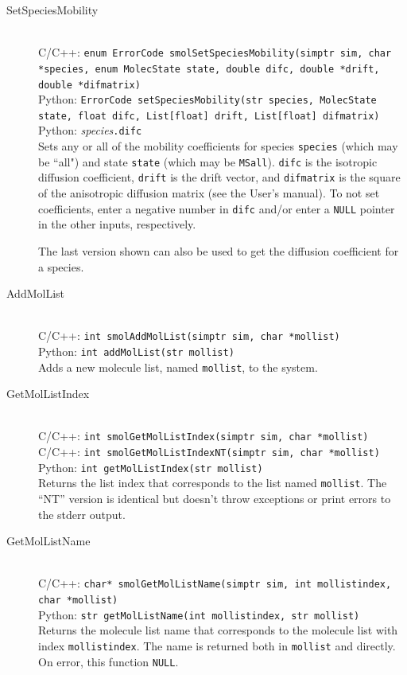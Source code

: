\documentclass {scrbook}
\newcommand {\ttt} {\texttt}
\begin{document}
\begin{description}
\item[SetSpeciesMobility]
\hfill \\
C/C++: \ttt{enum ErrorCode smolSetSpeciesMobility(simptr sim, char *species, enum MolecState state, double difc, double *drift, double *difmatrix)}\\
Python: \ttt{ErrorCode setSpeciesMobility(str species, MolecState state, float difc, List[float] drift, List[float] difmatrix)}\\
Python: \textit{species}\ttt{.difc}\\
Sets any or all of the mobility coefficients for species \ttt{species} (which may be ``all") and state \ttt{state} (which may be \ttt{MSall}). \ttt{difc} is the isotropic diffusion coefficient, \ttt{drift} is the drift vector, and \ttt{difmatrix} is the square of the anisotropic diffusion matrix (see the User's manual). To not set coefficients, enter a negative number in \ttt{difc} and/or enter a \ttt{NULL} pointer in the other inputs, respectively.

The last version shown can also be used to get the diffusion coefficient for a species.


\item[AddMolList]
\hfill \\
C/C++: \ttt{int smolAddMolList(simptr sim, char *mollist)}\\
Python: \ttt{int addMolList(str mollist)}\\
Adds a new molecule list, named \ttt{mollist}, to the system.

\item[GetMolListIndex]
\hfill \\
C/C++: \ttt{int smolGetMolListIndex(simptr sim, char *mollist)}\\
C/C++: \ttt{int smolGetMolListIndexNT(simptr sim, char *mollist)}\\
Python: \ttt{int getMolListIndex(str mollist)}\\
Returns the list index that corresponds to the list named \ttt{mollist}. The ``NT'' version is identical but doesn't throw exceptions or print errors to the stderr output.

\item[GetMolListName]
\hfill \\
C/C++: \ttt{char* smolGetMolListName(simptr sim, int mollistindex, char *mollist)}\\
Python: \ttt{str getMolListName(int mollistindex, str mollist)}\\
Returns the molecule list name that corresponds to the molecule list with index \ttt{mollistindex}. The name is returned both in \ttt{mollist} and directly. On error, this function \ttt{NULL}.


\end{description}
\end{document}
